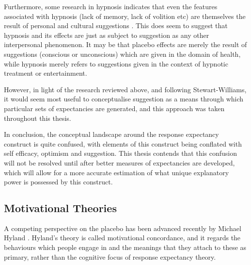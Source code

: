 Furthermore, some research in hypnosis indicates that even the features associated with hypnosis (lack of memory, lack of volition etc) are themselves the result of personal and cultural suggestions \cite{Kirsch1999}. This does seem to suggest that hypnosis and its effects are just as subject to suggestion as any other interpersonal phenomenon.  It may be that placebo effects are merely the result of suggestions (conscious or unconscious) which are given in the domain of health, while hypnosis merely refers to suggestions given in the context of hypnotic treatment or entertainment. 


However, in light of the research reviewed above, and following Stewart-Williams, it would seem most useful to conceptualise suggestion as a means through which particular sets of expectancies are generated, and this approach was taken throughout this thesis. 

In conclusion, the conceptual landscape around the response expectancy construct is quite confused, with elements of this construct being conflated with self efficacy, optimism and suggestion. This thesis contends that this confusion will not be resolved until after better measures of expectancies are developed, which will allow for a more accurate estimation of what unique explanatory power is possessed by this construct. 

\subsection{Motivational Theories}
\label{sec:behav-plac-motiv}

A competing perspective on the placebo has been advanced recently by Michael Hyland \cite{Hyland2006}. Hyland's theory is called motivational concordance, and it regards the behaviours which people engage in and the meanings that they attach to these as primary,  rather than the cognitive focus of response expectancy theory.  

